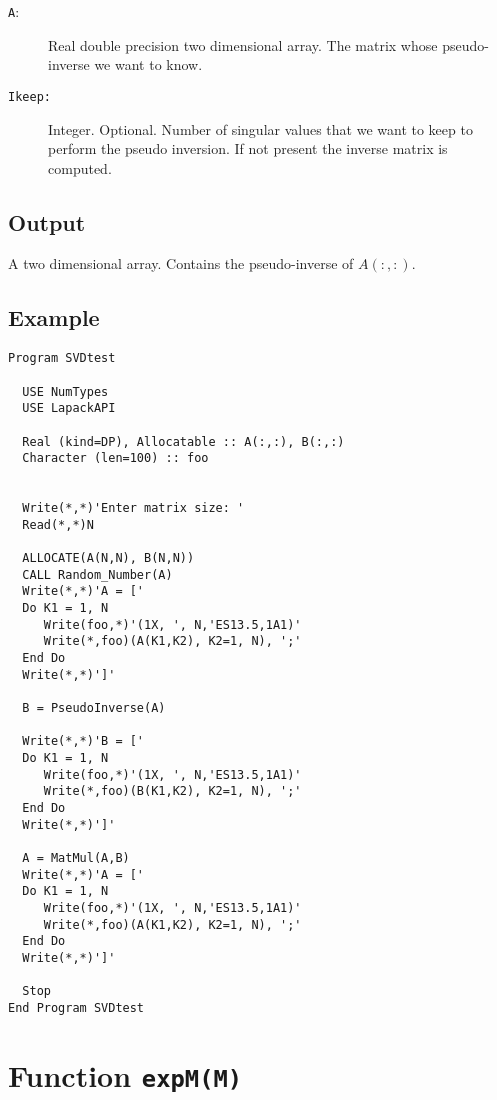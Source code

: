 \begin{description}
\item[\texttt{A}:]  Real double precision two dimensional array. The
  matrix whose pseudo-inverse we want to know.

\item[\texttt{Ikeep: }] Integer. Optional. Number of singular values
  that we want to keep to perform the pseudo inversion. If not present
  the inverse matrix is computed. 

\end{description}

\subsection{Output}

A two dimensional array. Contains the pseudo-inverse of $A(:,:)$.

\subsection{Example}

\begin{lstlisting}[emph=PseudoInverse,
                   emphstyle=\color{blue},
                   frame=trBL,
                   caption=Using lapack library to compute the inverse.,
                   label=pseudoinverse]
Program SVDtest

  USE NumTypes
  USE LapackAPI

  Real (kind=DP), Allocatable :: A(:,:), B(:,:)
  Character (len=100) :: foo
  

  Write(*,*)'Enter matrix size: '
  Read(*,*)N

  ALLOCATE(A(N,N), B(N,N))
  CALL Random_Number(A)
  Write(*,*)'A = ['
  Do K1 = 1, N
     Write(foo,*)'(1X, ', N,'ES13.5,1A1)'
     Write(*,foo)(A(K1,K2), K2=1, N), ';'
  End Do
  Write(*,*)']'

  B = PseudoInverse(A)

  Write(*,*)'B = ['
  Do K1 = 1, N
     Write(foo,*)'(1X, ', N,'ES13.5,1A1)'
     Write(*,foo)(B(K1,K2), K2=1, N), ';'
  End Do
  Write(*,*)']'

  A = MatMul(A,B)
  Write(*,*)'A = ['
  Do K1 = 1, N
     Write(foo,*)'(1X, ', N,'ES13.5,1A1)'
     Write(*,foo)(A(K1,K2), K2=1, N), ';'
  End Do
  Write(*,*)']'

  Stop
End Program SVDtest
\end{lstlisting}

\section{Function \texttt{expM(M)}}

